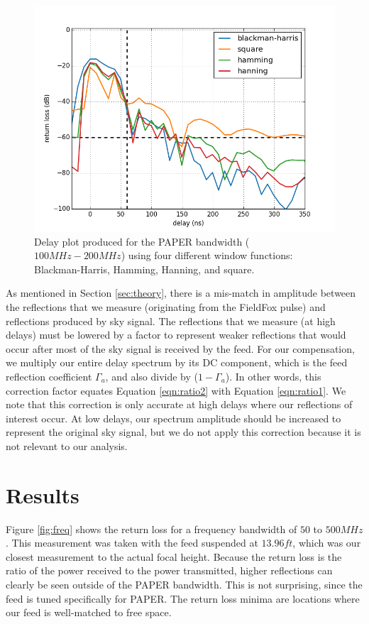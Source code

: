 \documentclass[12pt,preprint]{aastex}
\begin{document}
\begin{figure}
\centering
\includegraphics[totalheight=0.4\textheight]{plots/bh_vs_sq.png}
\caption{Delay plot produced for the PAPER bandwidth ($100MHz-200MHz$) using four different window functions: Blackman-Harris, Hamming, Hanning, and square.}
\label{fig:window}
\end{figure}

As mentioned in Section \ref{sec:theory}, there is a mis-match in amplitude
between the reflections that we measure (originating from the FieldFox pulse)
and reflections produced by sky signal. The reflections that we measure (at high
delays) must be lowered by a factor to represent weaker reflections that would
occur after most of the sky signal is received by the feed. For our
compensation, we multiply our entire delay spectrum by its DC component, which is the feed reflection coefficient $\Gamma_{a}$, and also divide by ($1-\Gamma_{a}$). In other words, this correction factor equates Equation \ref{eqn:ratio2} with Equation \ref{eqn:ratio1}. 
We note that this correction is only accurate at high delays where our
reflections of interest occur. At low delays, our spectrum amplitude should be
increased to represent the original sky signal, but we do not apply this
correction because it is not relevant to our analysis.

\section{Results}

Figure \ref{fig:freq} shows the return loss for a frequency bandwidth of $50$ to
$500MHz$. This measurement was taken with the feed suspended at $13.96ft$, which
was our closest measurement to the actual focal height.  Because the return
loss is the ratio of the power received to the power transmitted, higher
reflections can clearly be seen outside of the PAPER bandwidth. This is not
surprising, since the feed is tuned specifically for PAPER. The return loss
minima are locations where our feed is well-matched to free space.
\end{document}
